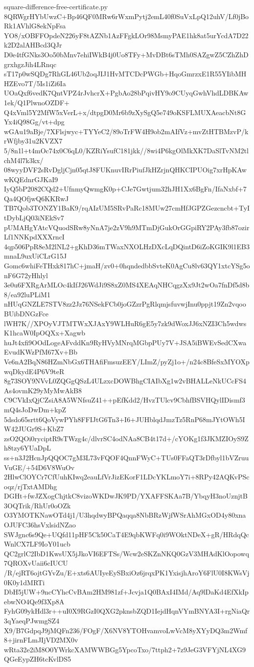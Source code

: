 \documentclass[11pt]{article}
\theoremstyle{definition}
\theoremstyle{remark}
\begin{document}
\begin{filecontents*}[overwrite]{square-difference-free-certificate.py}
8QRWgrHYbUwzC+Bp46QF0MRw6rWxmPytj2emL40f0SuVxLpQ12uhV/Lf0jBoRk1AVhlG8ekNpFsa
YO8/xOBFFOpdeN226yF8tAZNb1AzFFgkLOr98MsmyPAE1hk8at5urYcdA7D22k2D2alAHBcd3QJr
D0e4tfGNks3Oo50bMnv7ehiIWkB4j0Uo8TFy+MvDBt6sTMh0SAZgwZ5CZhZhDgrxhgzJih4LRnqc
sT17p0wSQDg7RhGL46Ub2oqJIJ1HvMTCDcPWGb+HqoGmrzxE1R55YIibMHHZEvo7T/5Is1iZi6Ia
UOaQxf6vedK7QntVPZ4rJvhcrX+PgbAo28bPqivHY9o9CUyqGwhVhdLDBKAw1ek/Q1PlwnoOZDF+
Q4xVml5Y2MfW5xVerL+x/dtpgD0Mr6b9zXySgQ5e749oKSFLMUXAeacbNt8GYx4iQ98Gg/vt+dpg
wGAu19aBje/7XFlsjwyc+TYYeC2/89oTrFW4H9ob2mAIfVz+mvZtHTBMzvP/krWfjby31u2KVZX7
5/8n1l+t4mOc74x0C6qL0/KZRiYsufC181jkk//8wi4P6kgOlMkXK7DaSlTvNM2tlchM4l7k3kx/
08wyyDVF2sRvDgljCjn05qtJ8FUKnuvIRrPiufJkHZrjnQHKCIPUOig7xrHpKAwwKQEdnrGJKaI9
IyQ5bP2082CQd2+UfnmyQwmgK0p+CJe7Gwtjum32hJH1Xx6BgFn/IfaNxbf+7Qa4QOfjwQ6KKRwJ
TB7Qob3TONZY1BaK9/rqAIzUM5SRvPaRc18MUw27cmHfJGPZGezcncbt+TyItDybLjQ03iNEkSv7
pUMAHgYAtcVQuodSRw8yNnA7je2zV9h9MTmDjGukOrGGpiRY2PAy3fb87ozirLf1NNKpdXXXrncI
4qp506PpR8eM2lNL2+gKhD36mTWaxNXOLHzDXcLqDQintD6iZoKGIK9l1EB3mnaL9uxUiCLrG15J
Gomc6whiFeTHxk817hC+jmaH/zv0+0hqndedbbSvteK0AgCu8lv63QY1xtcYSg5onF6G72yHhlyl
3e0u6FXRgArMLOc4kIfJ26WdJi9S8xZ0MS4XEAqNHCqgzXx9Jt2wOa7fnDf5d8b8/ea92luPLiM1
nHUqGNZLE7STV8zz2Jz76NSekFCb0joGZzrPgRlqmjsfuvwjInu0ppjt19Zn2vqooBUibDNGzFce
lWH7K//XPOyVJTMTWxXJAxY9WLHuR6gE5y7zk9dWoxJJ6xNZI3Ch5wdwsK1hcaW0IpOQXx+Xagwb
huJt4xfi9OOdLogeAFvddKn9RyHVyMNrqMGbpPUy7V+JSA5iBWEvSedCXwaEvudKWzPfM67Xv+Bb
Ve6nA2BqN86HZmNbGx6THAfiFmsuzEEY/LImZ/pyZj1o+/n24c8BfeSxMYOXpwqDkydE4P6V9teR
8g73SOY9NVvL0ZQGgQSzL4ULzxcDOWBhgCIAIbXg1w2vBHALLeNkUCcFS4As4ovmK29yMyMwAkB8
C9CVkIxQjCZsiA8A5WNfsuZ41++pEfKdd2/HvzTUlcv9CbhfBSVHQylIDismf3mQ4sJoDwDm+kpZ
5dsdo65srtt6QoVywPYh8FFIJtG6Tn3+I6+JUHblqdJmzTz5RnP68mJYtOWh5IW42JUGr9S+KbZ7
zsO2QOi0ryciptR9sTWzg4c/dlvrSC4odNAa8CB4t17d+/cYOKg1f3JKMZIOyS9Zh8tzy6YUaDpL
ss+n3J2HcnJpQQOC7gM3L73vFQOF4QnnFWyC+TUs0FFaQT3rDfbyl1bVZruuVuGE/+54D6V8WuOv
2HlwClOYCr7CfUuhKIwq2eauLfVrJizEKorF1LDcYKLmoY7i+8RPy42AQKvPScoqz/rjTxtAMDhg
DGHt+fwJZXogChjtkC8vizoWKDwJK9PD/YXAFFSKAa7B/YbqyH3noUznjtB3OQTrik/RhUr0oOZk
O3YMOTKNawOTd4j1/U3hqdwyBPQaqqa8NbBRzWjfWSrAhMGxOD4y80xnaOJUFC36hsVxlsidNZao
SWJgnc6s9Qe+UQfd11pHF5Ck50CaT4E9qbKWFq0i9WOktNDeX+gR/HRdqQcWnlCX7LF9IoY01ucb
QC2grlC2IbD1KwsUX5jJkoVI6EFTSs/Wcw2eSKZnNKQ0GzV3MHAdKlOopowq7QROXvUaii6cIUCU
/R/ejRT6ojtGYvZu/E+xts6AUIyeEySBxiOz6jrqxPK1YxisjhAroY6FlU0I8KWsVj0K0y1dMRTi
DbH5jUW+9ncCYhcCvBAm2HM981zf+Jcvja1Q0BAxI4IMd/Aq9lDaKd4EfXkIpebwNO4Qe9f3Xp8A
FyhG09ykHdl3r++uI0X9RGzI0QXG2pknsbZQD1IejdHqnVYmBNYA3I+rgNiaQr3qYaeqPJwmgSZ4
X9/B7GdpqJ9jMQFn236/FOgF/X6NV8YTOHvamvoLwVcM8yXYyDQ3m2Wmf8+jirnFLmJIjVD2MX0v
wRta32e2iM8O0YWrkcXAMWWBGg5YpcoTxo/7ttph2+7z9JeG3VFYjNL4XG9QGeEypZH6tcKvlDS5

\end{filecontents*}
\end{document}
